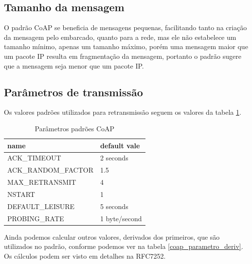 \subsection{Tamanho da mensagem}

O padrão CoAP se beneficia de mensagens pequenas, facilitando tanto na criação da mensagem pelo embarcado, quanto para a rede, mas ele não estabelece um tamanho mínimo, apenas um tamanho máximo, porém uma mensagem maior que um pacote IP resulta em fragmentação da mensagem, portanto o padrão sugere que a mensagem seja menor que um pacote IP.

\subsection{Parâmetros de transmissão}

Os valores padrões utilizados para retransmissão seguem os valores da tabela \ref{coap_parametro_default}.

\begin{table}[!htb]
	\centering
	\caption{Parâmetros padrões CoAP}
	\label{coap_parametro_default}
	\begin{tabular}{l|l}
		\hline
		name                & default vale  \\ \hline
		ACK\_TIMEOUT        & 2 seconds     \\ \hline
		ACK\_RANDOM\_FACTOR & 1.5           \\ \hline
		MAX\_RETRANSMIT     & 4             \\ \hline
		NSTART              & 1             \\ \hline
		DEFAULT\_LEISURE    & 5 seconds     \\ \hline
		PROBING\_RATE       & 1 byte/second \\ \hline
	\end{tabular}
\end{table}

Ainda podemos calcular outros valores, derivados dos primeiros, que são utilizados no padrão, conforme podemos ver na tabela \ref{coap_parametro_deriv}. Os cálculos podem ser visto em detalhes na RFC7252.

